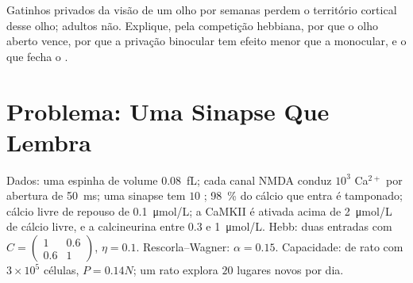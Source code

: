 \begin{exercise}[$\star\star\star$]\label{exo:b3:learning-memory:12}
Gatinhos privados da visão de um olho por semanas perdem o território
cortical desse olho; adultos não. Explique, pela competição hebbiana,
por que o olho aberto vence, por que a privação binocular tem efeito
menor que a monocular, e o que fecha o .
\end{exercise}

\section{Problema: Uma Sinapse Que Lembra}

\begin{problem}
\label{pb:b3:learning-memory:1}
Dados: uma espinha de volume \qty{0.08}{fL}; cada canal NMDA conduz
$10^{3}$ Ca$^{2+}$ por abertura de \qty{50}{ms}; uma sinapse tem $10$
; \qty{98}{\%} do cálcio que entra é tamponado; cálcio
livre de repouso de \qty{0.1}{\micro mol/L}; a CaMKII é ativada acima de
\qty{2}{\micro mol/L} de cálcio livre, e a calcineurina entre $0.3$ e
\qty{1}{\micro mol/L}. Hebb: duas entradas com $C = \begin{pmatrix}1 &
0.6\\ 0.6 & 1\end{pmatrix}$, $\eta = 0.1$. Rescorla--Wagner: $\alpha =
0.15$. Capacidade:  de rato com $3\times 10^{5}$ células, $P = 0.14N$; um rato explora $20$ lugares novos por dia.


\end{problem}
